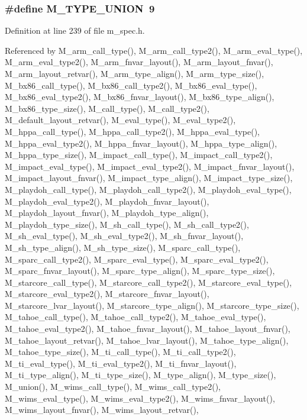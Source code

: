 \subsubsection{\setlength{\rightskip}{0pt plus 5cm}\#define M\_\-TYPE\_\-UNION~9}\label{m__spec_8h_e5dbf8588a22e17cbd70dcc00d25778e}




Definition at line 239 of file m\_\-spec.h.

Referenced by M\_\-arm\_\-call\_\-type(), M\_\-arm\_\-call\_\-type2(), M\_\-arm\_\-eval\_\-type(), M\_\-arm\_\-eval\_\-type2(), M\_\-arm\_\-fnvar\_\-layout(), M\_\-arm\_\-layout\_\-fnvar(), M\_\-arm\_\-layout\_\-retvar(), M\_\-arm\_\-type\_\-align(), M\_\-arm\_\-type\_\-size(), M\_\-bx86\_\-call\_\-type(), M\_\-bx86\_\-call\_\-type2(), M\_\-bx86\_\-eval\_\-type(), M\_\-bx86\_\-eval\_\-type2(), M\_\-bx86\_\-fnvar\_\-layout(), M\_\-bx86\_\-type\_\-align(), M\_\-bx86\_\-type\_\-size(), M\_\-call\_\-type(), M\_\-call\_\-type2(), M\_\-default\_\-layout\_\-retvar(), M\_\-eval\_\-type(), M\_\-eval\_\-type2(), M\_\-hppa\_\-call\_\-type(), M\_\-hppa\_\-call\_\-type2(), M\_\-hppa\_\-eval\_\-type(), M\_\-hppa\_\-eval\_\-type2(), M\_\-hppa\_\-fnvar\_\-layout(), M\_\-hppa\_\-type\_\-align(), M\_\-hppa\_\-type\_\-size(), M\_\-impact\_\-call\_\-type(), M\_\-impact\_\-call\_\-type2(), M\_\-impact\_\-eval\_\-type(), M\_\-impact\_\-eval\_\-type2(), M\_\-impact\_\-fnvar\_\-layout(), M\_\-impact\_\-layout\_\-fnvar(), M\_\-impact\_\-type\_\-align(), M\_\-impact\_\-type\_\-size(), M\_\-playdoh\_\-call\_\-type(), M\_\-playdoh\_\-call\_\-type2(), M\_\-playdoh\_\-eval\_\-type(), M\_\-playdoh\_\-eval\_\-type2(), M\_\-playdoh\_\-fnvar\_\-layout(), M\_\-playdoh\_\-layout\_\-fnvar(), M\_\-playdoh\_\-type\_\-align(), M\_\-playdoh\_\-type\_\-size(), M\_\-sh\_\-call\_\-type(), M\_\-sh\_\-call\_\-type2(), M\_\-sh\_\-eval\_\-type(), M\_\-sh\_\-eval\_\-type2(), M\_\-sh\_\-fnvar\_\-layout(), M\_\-sh\_\-type\_\-align(), M\_\-sh\_\-type\_\-size(), M\_\-sparc\_\-call\_\-type(), M\_\-sparc\_\-call\_\-type2(), M\_\-sparc\_\-eval\_\-type(), M\_\-sparc\_\-eval\_\-type2(), M\_\-sparc\_\-fnvar\_\-layout(), M\_\-sparc\_\-type\_\-align(), M\_\-sparc\_\-type\_\-size(), M\_\-starcore\_\-call\_\-type(), M\_\-starcore\_\-call\_\-type2(), M\_\-starcore\_\-eval\_\-type(), M\_\-starcore\_\-eval\_\-type2(), M\_\-starcore\_\-fnvar\_\-layout(), M\_\-starcore\_\-lvar\_\-layout(), M\_\-starcore\_\-type\_\-align(), M\_\-starcore\_\-type\_\-size(), M\_\-tahoe\_\-call\_\-type(), M\_\-tahoe\_\-call\_\-type2(), M\_\-tahoe\_\-eval\_\-type(), M\_\-tahoe\_\-eval\_\-type2(), M\_\-tahoe\_\-fnvar\_\-layout(), M\_\-tahoe\_\-layout\_\-fnvar(), M\_\-tahoe\_\-layout\_\-retvar(), M\_\-tahoe\_\-lvar\_\-layout(), M\_\-tahoe\_\-type\_\-align(), M\_\-tahoe\_\-type\_\-size(), M\_\-ti\_\-call\_\-type(), M\_\-ti\_\-call\_\-type2(), M\_\-ti\_\-eval\_\-type(), M\_\-ti\_\-eval\_\-type2(), M\_\-ti\_\-fnvar\_\-layout(), M\_\-ti\_\-type\_\-align(), M\_\-ti\_\-type\_\-size(), M\_\-type\_\-align(), M\_\-type\_\-size(), M\_\-union(), M\_\-wims\_\-call\_\-type(), M\_\-wims\_\-call\_\-type2(), M\_\-wims\_\-eval\_\-type(), M\_\-wims\_\-eval\_\-type2(), M\_\-wims\_\-fnvar\_\-layout(), M\_\-wims\_\-layout\_\-fnvar(), M\_\-wims\_\-layout\_\-retvar(), 